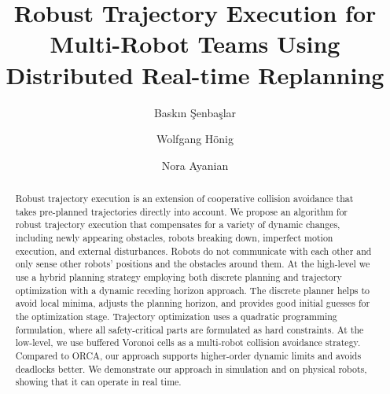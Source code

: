 \documentclass{svproc}
\begin{document}
\mainmatter              %
%
% 
\title{Robust Trajectory Execution for Multi-Robot Teams Using Distributed Real-time Replanning}%


%
%
\author{Baskın Şenbaşlar \and Wolfgang H\"onig \and
Nora Ayanian}
%
%
%

\maketitle              %

\begin{abstract}
Robust trajectory execution is an extension of cooperative collision avoidance that takes pre-planned trajectories directly into account.
We propose an algorithm for robust trajectory execution that compensates for a variety of dynamic changes, including newly appearing obstacles, robots breaking down, imperfect motion execution, and external disturbances.
Robots do not communicate with each other and only sense other robots' positions and the obstacles around them.
At the high-level we use a hybrid planning strategy employing both discrete planning and trajectory optimization with a dynamic receding horizon approach.
The discrete planner helps to avoid local minima, adjusts the planning horizon, and provides good initial guesses for the optimization stage.
Trajectory optimization uses a quadratic programming formulation, where all safety-critical parts are formulated as hard constraints.
At the low-level, we use buffered Voronoi cells as a multi-robot collision avoidance strategy.
Compared to ORCA, our approach supports higher-order dynamic limits and avoids deadlocks better.
We demonstrate our approach in simulation and on physical robots, showing that it can operate in real time.
\end{abstract}
\end{document}
